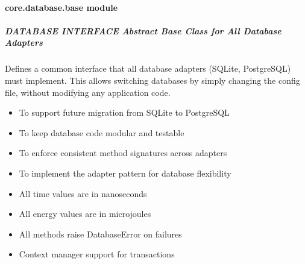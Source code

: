 \documentclass[letterpaper,10pt,english]{sphinxmanual}
\begin{document}
\paragraph{core.database.base module}
\label{\detokenize{core.database.base:module-core.database.base}}\label{\detokenize{core.database.base:core-database-base-module}}\label{\detokenize{core.database.base::doc}}

\subparagraph{DATABASE INTERFACE \textendash{} Abstract Base Class for All Database Adapters}
\label{\detokenize{core.database.base:database-interface-abstract-base-class-for-all-database-adapters}}\begin{description}
\sphinxAtStartPar
Defines a common interface that all database adapters (SQLite, PostgreSQL)
must implement. This allows switching databases by simply changing the
config file, without modifying any application code.

\begin{itemize}
\item {} 
\sphinxAtStartPar
To support future migration from SQLite to PostgreSQL

\item {} 
\sphinxAtStartPar
To keep database code modular and testable

\item {} 
\sphinxAtStartPar
To enforce consistent method signatures across adapters

\item {} 
\sphinxAtStartPar
To implement the adapter pattern for database flexibility

\end{itemize}

\begin{itemize}
\item {} 
\sphinxAtStartPar
All time values are in nanoseconds

\item {} 
\sphinxAtStartPar
All energy values are in microjoules

\item {} 
\sphinxAtStartPar
All methods raise DatabaseError on failures

\item {} 
\sphinxAtStartPar
Context manager support for transactions

\end{itemize}

\end{description}
\end{document}
